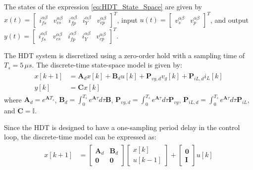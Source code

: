 The states of the expression \eqref{eq:HDT_State_Space} are given by $x(t) = \begin{bmatrix} i_{fs}^{\alpha\beta} & v_{cs}^{\alpha\beta} & i_{fp}^{\alpha\beta} & i_{Y}^{\alpha\beta} & v_{cp}^{\alpha\beta} \end{bmatrix}^T$, input $u(t) = \begin{bmatrix} v_s^{\alpha\beta} & v_p^{\alpha\beta} \end{bmatrix}^T$, and output \linebreak $y(t) = \begin{bmatrix} i_{fs}^{\alpha\beta} & v_{cs}^{\alpha\beta} & i_{fp}^{\alpha\beta} & i_{Y}^{\alpha\beta} & v_{cp}^{\alpha\beta} \end{bmatrix}^T$.

The HDT system is discretized using a zero-order hold with a sampling time of $T_s = 5\,\mu s$. The discrete-time state-space model is given by:
\begin{align}
    \begin{aligned}
        x[k+1] &= \mathbf{A}_d x[k] + \mathbf{B}_d u[k] + \mathbf{P}_{vg,d} v_g[k] + \mathbf{P}_{iL,d} i_L[k]\\
        y[k] &= \mathbf{C} x[k]
    \end{aligned}
\end{align}
where $\mathbf{A}_d = e^{\mathbf{A}T_s}$, $\mathbf{B}_d = \int_0^{T_s} e^{\mathbf{A}\tau} d\tau \mathbf{B}$, $\mathbf{P}_{vg,d} = \int_0^{T_s} e^{\mathbf{A}\tau} d\tau \mathbf{P}_{vg}$, $\mathbf{P}_{iL,d} = \int_0^{T_s} e^{\mathbf{A}\tau} d\tau \mathbf{P}_{iL}$, and $\mathbf{C} = \mathbb{I}$.

Since the HDT is designed to have a one-sampling period delay in the control loop, the discrete-time model can be expressed as:
\begin{align}
    \begin{aligned}
        x[k+1] &=
        \begin{bmatrix}
            \mathbf{A}_d & \mathbf{B}_d \\
            \mathbf{0} & \mathbf{0}
        \end{bmatrix}
        \begin{bmatrix}
            x[k]\\
            u[k-1]
        \end{bmatrix}
        +
        \begin{bmatrix}
            \mathbf{0}\\
            \mathbf{I}
        \end{bmatrix}
        u[k]
    \end{aligned}
\end{align}